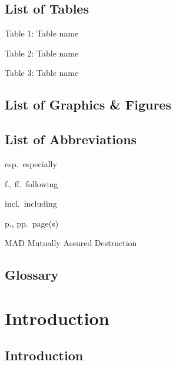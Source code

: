 \documentclass[12pt,a4paper]{report}      %
\begin{document}

\section*{List of Tables}\label{list-of-tables}


Table 1: Table name

Table 2: Table name

Table 3: Table name

\section*{List of Graphics \& Figures}\label{list-of-graphics-figures}


\section*{List of Abbreviations}\label{list-of-abbreviations}


esp.~especially

f., ff.~following

incl.~including

p., pp.~page(s)

MAD Mutually Assured Destruction

\section*{Glossary}\label{glossary}



\chapter{Introduction}\label{introduction}

\section{Introduction}\label{introduction-1}
\end{document}
